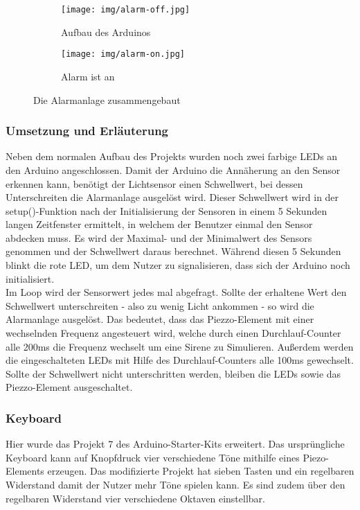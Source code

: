 \begin{figure}[h]
	\centering
	\begin{subfigure}[b]{0.48\linewidth}
		\centering
		\texttt{[image: img/alarm-off.jpg]}
		\caption{Aufbau des Arduinos}
	\end{subfigure}\enspace%
	\begin{subfigure}[b]{0.48\linewidth}
		\centering
		\texttt{[image: img/alarm-on.jpg]}
		\caption{Alarm ist an}
	\end{subfigure}
	\caption{Die Alarmanlage zusammengebaut}
\end{figure}

\subsubsection{Umsetzung und Erläuterung}
Neben dem normalen Aufbau des Projekts wurden noch zwei farbige LEDs an den Arduino angeschlossen.
Damit der Arduino die Annäherung an den Sensor erkennen kann, benötigt der Lichtsensor einen Schwellwert, bei dessen Unterschreiten die Alarmanlage ausgelöst wird. Dieser Schwellwert wird in der setup()-Funktion nach der Initialisierung der Sensoren in einem 5 Sekunden langen Zeitfenster ermittelt, in welchem der Benutzer einmal den Sensor abdecken muss. Es wird der Maximal- und der Minimalwert des Sensors genommen und der Schwellwert daraus berechnet. Während diesen 5 Sekunden blinkt die rote LED, um dem Nutzer zu signalisieren, dass sich der Arduino noch initialisiert.\\
Im Loop wird der Sensorwert jedes mal abgefragt. Sollte der erhaltene Wert den Schwellwert unterschreiten - also zu wenig Licht ankommen - so wird die Alarmanlage ausgelöst. Das bedeutet, dass das Piezzo-Element mit einer wechselnden Frequenz angesteuert wird, welche durch einen Durchlauf-Counter alle 200ms die Frequenz wechselt um eine Sirene zu Simulieren. Außerdem werden die eingeschalteten LEDs mit Hilfe des Durchlauf-Counters alle 100ms gewechselt.
Sollte der Schwellwert nicht unterschritten werden, bleiben die LEDs sowie das Piezzo-Element ausgeschaltet.

\subsubsection{Keyboard}
Hier wurde das Projekt 7 des Arduino-Starter-Kits erweitert. Das ursprüngliche Keyboard kann auf Knopfdruck vier verschiedene Töne mithilfe eines Piezo-Elements erzeugen. Das modifizierte Projekt hat sieben Tasten und ein regelbaren Widerstand
damit der Nutzer mehr Töne spielen kann. Es sind zudem über den regelbaren Widerstand vier verschiedene Oktaven einstellbar.

